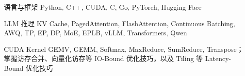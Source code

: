 

\begin{cvskills}

  \cvskill
    {语言与框架}
    {Python, C++, CUDA, C, Go, PyTorch, Hugging Face}

  \cvskill
    {LLM 推理}
    {KV Cache, PagedAttention, FlashAttention, Continuous Batching, AWQ, TP, EP, DP, MoE, EPLB, vLLM, Transformers, Qwen}

  \cvskill
    {CUDA Kernel}
    {GEMV, GEMM, Softmax, MaxReduce, SumReduce, Transpose；掌握访存合并、向量化访存等 IO-Bound 优化技巧，以及 Tiling 等 Latency-Bound 优化技巧}

\end{cvskills}
